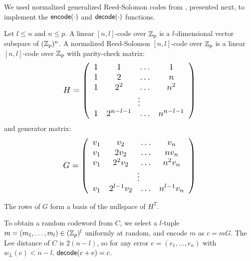%


%
%
We used normalized generalized Reed-Solomon codes from \cite{rot06}, presented next, to implement the ${\sf encode}(\cdot)$ and ${\sf decode}(\cdot)$ functions.
%


%
%
%

\begin{definition}
Let $l \leq n$ and $n\leq p$. A linear $[n, l]$-code over $\mathbb{Z}_p$ is a $l$-dimensional vector subspace of $(\mathbb{Z}_p)^n$. 
 A normalized Reed-Solomon $[n, l]$-code over $\mathbb{Z}_p$ is a linear $[n, l]$-code over $\mathbb{Z}_p$ with parity-check matrix: 
\[ \resizebox{0.55\linewidth}{!}{$
 H = \left( 
 \begin{array}{cccc}
1 & 1   & \ldots & 1 \\
1 & 2   & \ldots & n \\
1 & 2^2 & \ldots & n^2 \\
\multicolumn{4}{c}{\vdots}   \\
1 & 2^{n-l-1} & \ldots & n^{n-l-1} \\
 \end{array} 
 \right)$}
\]
%
and generator matrix:
%
\[ \resizebox{0.55\linewidth}{!}{$
 G = \left( 
 \begin{array}{cccc}
v_1 &     v_2 & \ldots &     v_n \\
v_1 & 2   v_2 & \ldots & n   v_n \\
v_1 & 2^2 v_2 & \ldots & n^2 v_n \\
\multicolumn{4}{c}{\vdots}   \\
v_1 & 2^{l-1} v_2 & \ldots & n^{l-1} v_n \\
 \end{array} 
 \right) $}
\]
\end{definition}

The rows of $G$ form a basis of the nullspace of $H^T$. 

%
%
%
%
To obtain a random codeword from $C$, we select a $l$-tuple $m = (m_1, \ldots, m_l) \in (\mathbb{Z}_p)^l$ uniformly at random, and encode $m$ as $c = mG$. 
%
The Lee distance of $C$ is $2(n-l)$, so for any error $e = (e_1, \ldots, e_n)$ with $w_L(e) < n-l$, ${\sf decode}(c+e) = c$.

%

%
%
%
%
%
%
%

%





%
%
%
%

%

%
%
%
%
%
%
%
%
%
%
%
%


